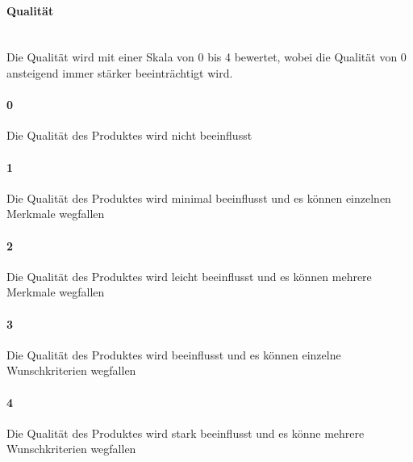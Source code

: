 \begin{indentE}\mbox{}
	\paragraph{Qualität}\mbox{}\\
	Die Qualität wird mit einer Skala von 0 bis 4 bewertet, wobei die Qualität von 0 ansteigend immer stärker beeinträchtigt wird.
	\paragraph{0} Die Qualität des Produktes wird nicht beeinflusst
	\paragraph{1} Die Qualität des Produktes wird minimal beeinflusst und es können einzelnen Merkmale wegfallen
	\paragraph{2} Die Qualität des Produktes wird leicht beeinflusst und es können mehrere Merkmale wegfallen
	\paragraph{3} Die Qualität des Produktes wird beeinflusst und es können einzelne Wunschkriterien wegfallen
	\paragraph{4} Die Qualität des Produktes wird stark beeinflusst und es könne mehrere Wunschkriterien wegfallen
\end{indentE}
